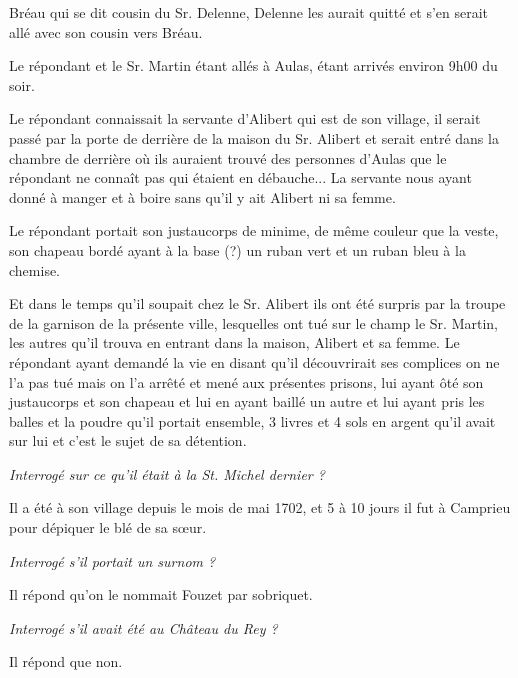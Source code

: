 

Bréau qui se dit cousin du Sr. Delenne, Delenne les aurait quitté et s’en serait allé avec son cousin vers Bréau.

Le répondant et le Sr. Martin étant allés à Aulas, étant arrivés environ 9h00 du soir.

Le répondant connaissait la servante d’Alibert qui est de son village, il serait passé par la porte de derrière de la maison du Sr. Alibert et serait entré dans la chambre de derrière où ils auraient trouvé des personnes d’Aulas que le répondant ne connaît pas qui étaient en débauche... La servante nous ayant donné à manger et à boire sans qu’il y ait Alibert ni sa femme.

Le répondant portait son justaucorps de minime, de même couleur que la veste, son chapeau bordé ayant à la base (?) un ruban vert et un ruban bleu à la chemise.

Et dans le temps qu’il soupait chez le Sr. Alibert ils ont été surpris par la troupe de la garnison de la présente ville, lesquelles ont tué sur le champ le Sr. Martin, les autres qu’il trouva en entrant dans la maison, Alibert et sa femme. Le répondant ayant demandé la vie en disant qu’il découvrirait ses complices on ne l’a pas tué mais on l’a arrêté et mené aux présentes prisons, lui ayant ôté son justaucorps et son chapeau et lui en ayant baillé un autre et lui ayant pris les balles et la poudre qu’il portait ensemble, 3 livres et 4 sols en argent qu’il avait sur lui et c’est le sujet de sa détention.

\vspace{0.35em}

\textit{Interrogé sur ce qu’il était à la St. Michel dernier ?}

Il a été à son village depuis le mois de mai 1702, et 5 à 10 jours il fut à Camprieu pour dépiquer le blé de sa sœur.

\vspace{0.2em}

\textit{Interrogé s’il portait un surnom ?}

Il répond qu’on le nommait Fouzet par sobriquet.

\vspace{0.2em}

\textit{Interrogé s’il avait été au Château du Rey ?}

Il répond que non.

\vspace{0.2em}

